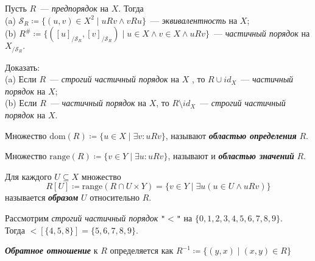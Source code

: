 \documentclass{article}
\begin{document}
    \begin{task_boxed}
        Пусть $R$~--- \textit{предпорядок} на $X$.
        Тогда\\
        (a) $\mathscr{S}_R \coloneqq \{(u, v) \in X^2 \mid  uRv \wedge vRu\}$~--- \textit{эквивалентность} на $X$;\\
        (b) $R^\# \coloneqq\{([u]_{/\mathscr{S}_R},[v]_{/\mathscr{S}_R})\mid u\in X\wedge v\in X\wedge uRv\}$~--- \textit{частичный порядок }на $X_{/\mathscr{S}_R}.$
    \end{task_boxed}

    \begin{task_boxed}
        Доказать:\\
        (a) Если $R$~--- \textit{строгий частичный порядок} на $X$ , то $R \cup id_X$~--- \textit{частичный порядок} на $X$; \\
        (b) Если $R$~--- \textit{частичный порядок} на $X$, то $R \setminus id_X$~--- \textit{строгий частичный порядок} на $X$.
    \end{task_boxed}

    \begin{definition_boxed}
        Множество
        $\mathrm{dom}(R)\coloneqq\{u\in X\mid\exists v: uRv\}$,
        называют \textit{\textbf{областью определения}} $R$.
    \end{definition_boxed}

    \begin{definition_boxed}
        Множество
        $\mathrm{range}(R) \coloneqq \{v\in Y\mid\exists u: uRv\}$,
        называют и \textit{\textbf{областью значений}} $R$.
    \end{definition_boxed}

    \begin{definition_boxed}
        Для каждого $U \subseteq X$ множество
        \[R[U] \coloneqq \mathrm{range}(R\cap U\times Y) = \{v \in Y  \mid \exists u(u\in U\wedge uRv)\}\] называется \textit{\textbf{образом}} $U$ относительно $R$.
    \end{definition_boxed}

    \begin{example}
        Рассмотрим \textit{строгий частичный порядок} \texttt{"$<$"} на $\{0,1,2,3,4,5,6,7,8,9\}.$\\
        Тогда $<[\{4,5,8\}] = \{5,6,7,8,9\}.$
    \end{example}

    \begin{definition_boxed}
        \textit{\textbf{Обратное отношение}} к $R$ определяется как
        $R^{-1} \coloneqq \{(y,x) \mid (x,y) \in R\}$
    \end{definition_boxed}
\end{document}

